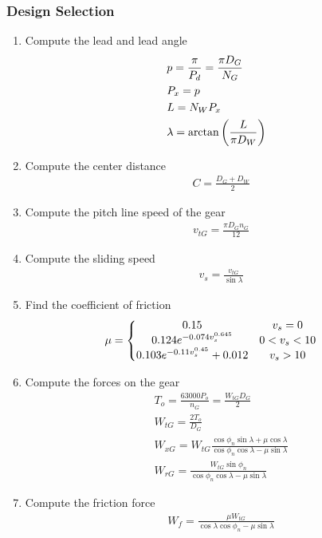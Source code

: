 \documentclass[11pt, fleqn]{article}
\begin{document}
\subsubsection{Design Selection}
\begin{enumerate}
    \item Compute the lead and lead angle
    \begin{align*}
        &p=\frac{\pi}{P_d}=\frac{\pi D_G}{N_G}\\
        &P_x=p\\
        &L=N_WP_x\\
        &\lambda=\arctan\left( \frac{L}{\pi D_W} \right)
    \end{align*}
    \item Compute the center distance
    \begin{align*}
        &C=\frac{D_G+D_W}{2}
    \end{align*}
    \item Compute the pitch line speed of the gear
    \begin{align*}
        &v_{tG}=\frac{\pi D_Gn_G}{12}
    \end{align*}
    \item Compute the sliding speed
    \begin{align*}
        &v_s=\frac{v_{tG}}{\sin\lambda}
    \end{align*}
    \item Find the coefficient of friction
    \begin{align*}
        &\mu=\left\{\begin{matrix} 0.15 & v_s=0\\ 0.124e^{-0.074v_s^{0.645}} & 0<v_s<10\\ 0.103e^{-0.11v_s^{0.45}}+0.012 & v_s>10 \end{matrix}\right.
    \end{align*}
    \item Compute the forces on the gear
    \begin{align*}
        &T_o=\frac{63000P_o}{n_G}=\frac{W_{tG}D_G}{2}\\
        &W_{tG}=\frac{2T_o}{D_G}\\
        &W_{xG}=W_{tG}\frac{\cos\phi_n\sin\lambda+\mu\cos\lambda}{\cos\phi_n\cos\lambda-\mu\sin\lambda}\\
        &W_{rG}=\frac{W_{tG}\sin\phi_n}{\cos\phi_n\cos\lambda-\mu\sin\lambda}
    \end{align*}
    \item Compute the friction force
    \begin{align*}
        &W_f=\frac{\mu W_{tG}}{\cos\lambda\cos\phi_n-\mu\sin\lambda}

\end{align*}
\end{enumerate}
\end{document}
